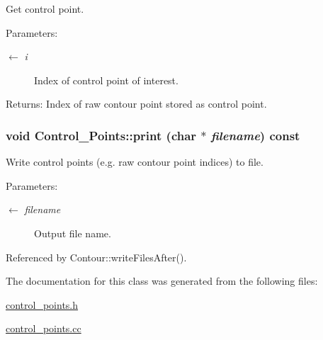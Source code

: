 Get control point. \begin{Desc}
\item[Parameters:]
\begin{description}
\item[\mbox{$\leftarrow$} {\em i}]Index of control point of interest. \end{description}
\end{Desc}
\begin{Desc}
\item[Returns:]Index of raw contour point stored as control point. \end{Desc}
\hypertarget{classControl__Points_7970a63575538777628a42a3847b7af3}{
\subsubsection[print]{\setlength{\rightskip}{0pt plus 5cm}void Control\_\-Points::print (char $\ast$ {\em filename}) const}}
\label{classControl__Points_7970a63575538777628a42a3847b7af3}


Write control points (e.g. raw contour point indices) to file. \begin{Desc}
\item[Parameters:]
\begin{description}
\item[\mbox{$\leftarrow$} {\em filename}]Output file name. \end{description}
\end{Desc}


Referenced by Contour::writeFilesAfter().

The documentation for this class was generated from the following files:\begin{CompactItemize}
\item 
\hyperlink{control__points_8h}{control\_\-points.h}\item 
\hyperlink{control__points_8cc}{control\_\-points.cc}\end{CompactItemize}
